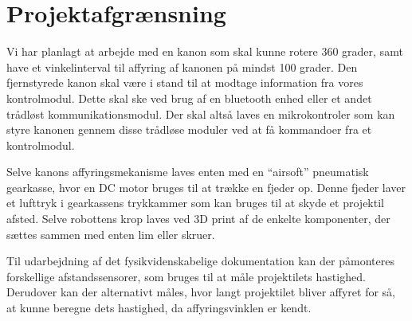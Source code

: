\section{Projektafgrænsning}

Vi har planlagt at arbejde med en kanon som skal kunne rotere 360 grader, samt have et vinkelinterval til affyring af kanonen på mindst 100 grader. Den fjernstyrede kanon skal være i stand til at modtage information fra vores kontrolmodul. Dette skal ske ved brug af en bluetooth enhed eller et andet trådløst kommunikationsmodul. Der skal altså laves en mikrokontroler som kan styre kanonen gennem disse trådløse moduler ved at få kommandoer fra et kontrolmodul.

Selve kanons affyringsmekanisme laves enten med en “airsoft” pneumatisk gearkasse, hvor en DC motor bruges til at trække en fjeder op. Denne fjeder laver et lufttryk i gearkassens trykkammer som kan bruges til at skyde et projektil afsted. Selve robottens krop laves ved 3D print af de enkelte komponenter, der sættes sammen med enten lim eller skruer. 

Til udarbejdning af det fysikvidenskabelige dokumentation kan der påmonteres forskellige afstandssensorer, som bruges til at måle projektilets hastighed. Derudover kan der alternativt måles, hvor langt projektilet bliver affyret for så, at kunne beregne dets hastighed, da affyringsvinklen er kendt.

